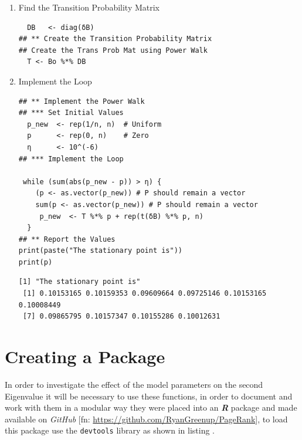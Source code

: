 \documentclass[11pt]{article}
\begin{document}
\begin{enumerate}
\begin{verbatim}
(δB   <- 1/(colSums(Bo)+n))
\end{verbatim}

\begin{verbatim}
        1         2         8         5         7         6         9         3
0.1041558 0.1086720 0.1000000 0.1013479 0.1013479 0.1013479 0.1000000 0.1071237
        4        10
0.1056189 0.1000000
\end{verbatim}


\begin{verbatim}
(δB   <- 1/(colSums(B)))
\end{verbatim}

\begin{verbatim}
        1         2         8         5         7         6         9         3
0.1041558 0.1086720 0.1000000 0.1013479 0.1013479 0.1013479 0.1000000 0.1071237
        4        10
0.1056189 0.1000000
\end{verbatim}


\item Find the Transition Probability Matrix
\label{sec:org33ae814}
\begin{verbatim}
  DB   <- diag(δB)
## ** Create the Transition Probability Matrix
## Create the Trans Prob Mat using Power Walk
  T <- Bo %*% DB
\end{verbatim}

\item Implement the Loop
\label{sec:orgd99ca68}
\begin{verbatim}
## ** Implement the Power Walk
## *** Set Initial Values
  p_new  <- rep(1/n, n)  # Uniform
  p      <- rep(0, n)    # Zero
  η      <- 10^(-6)
## *** Implement the Loop

 while (sum(abs(p_new - p)) > η) {
    (p <- as.vector(p_new)) # P should remain a vector
    sum(p <- as.vector(p_new)) # P should remain a vector
     p_new  <- T %*% p + rep(t(δB) %*% p, n)
  }
## ** Report the Values
print(paste("The stationary point is"))
print(p)
\end{verbatim}

\begin{verbatim}
[1] "The stationary point is"
 [1] 0.10153165 0.10159353 0.09609664 0.09725146 0.10153165 0.10008449
 [7] 0.09865795 0.10157347 0.10155286 0.10012631
\end{verbatim}
\end{enumerate}

\section{Creating a Package}
\label{create-package}
In order to investigate the effect of the model parameters on the second
Eigenvalue it will be necessary to use these functions, in order to document and
work with them in a modular way they were placed into an \textbf{\emph{R}} package and made
available on \emph{GitHub} [fn: \url{https://github.com/RyanGreenup/PageRank}], to load this package use the \texttt{devtools} library as shown in listing .
\end{document}
